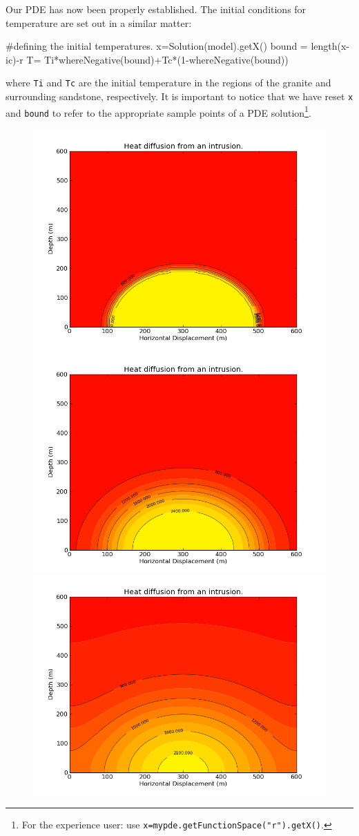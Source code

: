 Our PDE has now been properly established. The initial conditions for temperature are set out in a similar matter:
\begin{python}
#defining the initial temperatures.
x=Solution(model).getX()
bound = length(x-ic)-r
T= Ti*whereNegative(bound)+Tc*(1-whereNegative(bound))
\end{python}
where \verb|Ti| and \verb|Tc| are the initial temperature
in the regions of the granite and surrounding sandstone, respectively. It is important to
notice that we have reset \verb|x| and \verb|bound| to refer to the appropriate 
sample points of a PDE solution\footnote{For the experience user: use \texttt{x=mypde.getFunctionSpace("r").getX()}.}.

\begin{figure}[h]
\centerline{\includegraphics[width=4.in]{figures/heatrefraction001.png}}
\centerline{\includegraphics[width=4.in]{figures/heatrefraction030.png}}
\centerline{\includegraphics[width=4.in]{figures/heatrefraction200.png}}

\end{figure}
